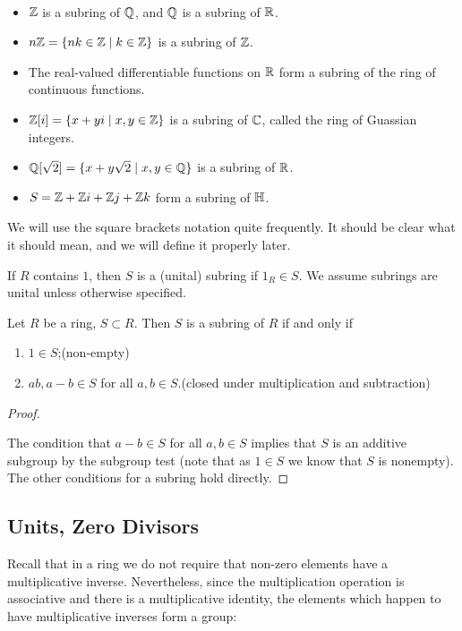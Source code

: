 \begin{example} \
\begin{itemize}
\item $\mathbb Z$ is a subring of $\mathbb Q$, and $\mathbb Q$ is a subring of $\mathbb R$.
\item $n\mathbb Z=\{nk\in\mathbb Z\mid k\in\mathbb Z\}$ is a subring of $\mathbb Z$.
\item The real-valued differentiable functions on $\mathbb R$ form a subring of the ring of continuous functions.
\item $\mathbb Z[i]=\{x+yi\mid x,y\in\mathbb Z\}$ is a subring of $\mathbb C$, called the ring of Guassian integers.
\item $\mathbb Q[\sqrt{2}]=\{x+y\sqrt{2}\mid x,y\in\mathbb Q\}$ is a subring of $\mathbb R$.
\item $S=\mathbb Z+\mathbb Z i+\mathbb Z j+\mathbb Z k$ form a subring of $\mathbb H$.
\end{itemize}
We will use the square brackets notation quite frequently. It should be clear what it should mean, and we will define it properly later.
\end{example}

If $R$ contains $1$, then $S$ is a (unital) subring if $1_R\in S$. We assume subrings are unital unless otherwise specified.

\begin{lemma}
Let $R$ be a ring, $S\subset R$. Then $S$ is a subring of $R$ if and only if
\begin{enumerate}[label=(\roman*)]
\item $1\in S$;\hfill(non-empty)
\item $ab,a-b\in S$ for all $a,b\in S$.\hfill(closed under multiplication and subtraction)
\end{enumerate}
\end{lemma}

\begin{proof} \

\fbox{$\implies$} 

\fbox{$\impliedby$} The condition that $a-b\in S$ for all $a,b\in S$ implies that $S$ is an additive subgroup by the subgroup test (note that as $1\in S$ we know that $S$ is nonempty). The other conditions for a subring hold directly.
\end{proof}

\subsection{Units, Zero Divisors}
Recall that in a ring we do not require that non-zero elements have a multiplicative inverse. 
Nevertheless, since the multiplication operation is associative and there is a multiplicative identity, the elements which happen to have multiplicative inverses form a group:

